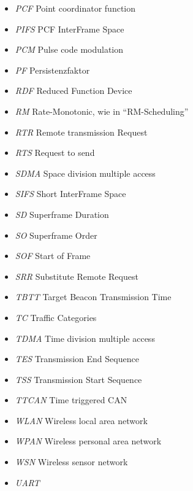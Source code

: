 \documentclass{article}
\begin{document}
\begin{itemize}
	\item \emph{PCF} Point coordinator function
	\item \emph{PIFS} PCF InterFrame Space
	\item \emph{PCM} Pulse code modulation
	\item \emph{PF} Persistenzfaktor
	\item \emph{RDF} Reduced Function Device
	\item \emph{RM} Rate-Monotonic, wie in "`RM-Scheduling"'
	\item \emph{RTR} Remote transmission Request
	\item \emph{RTS} Request to send
	\item \emph{SDMA} Space division multiple access
	\item \emph{SIFS} Short InterFrame Space
	\item \emph{SD} Superframe Duration
	\item \emph{SO} Superframe Order
	\item \emph{SOF} Start of Frame
	\item \emph{SRR} Substitute Remote Request
	\item \emph{TBTT} Target Beacon Transmission Time
	\item \emph{TC} Traffic Categories
	\item \emph{TDMA} Time division multiple access
	\item \emph{TES} Transmission End Sequence
	\item \emph{TSS} Transmission Start Sequence
	\item \emph{TTCAN} Time triggered CAN
	\item \emph{WLAN} Wireless local area network
	\item \emph{WPAN} Wireless personal area network
	\item \emph{WSN} Wireless sensor network
	\item \emph{UART}
\end{itemize}
\end{document}
